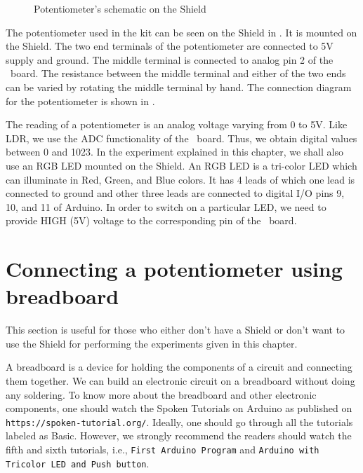 \begin{figure}
\centering
{} \hfill
{}
\caption{Potentiometer's schematic on the Shield}
\label{fig:potmeterconn}
\end{figure}

The potentiometer used in the kit can be seen on the Shield in
.  It is
mounted on the Shield. The two end terminals of the potentiometer are
connected to 5V supply and ground. The middle terminal is connected to
analog pin 2 of the \arduino\ board. The resistance between the middle
terminal and either of the two ends can be varied by rotating the
middle terminal by hand. The connection diagram for the potentiometer
is shown in .

The reading of a potentiometer is an analog voltage varying from 0 to
5V. Like LDR, we use the ADC functionality of the
\arduino\ board. Thus, we obtain digital values between 0 and 1023. 
In the experiment explained in this chapter, we shall also use an RGB
LED mounted on the Shield. An RGB LED is a tri-color LED which can
illuminate in Red, Green, and Blue colors. It has 4 leads of which one
lead is connected to ground and other three leads are connected to
digital I/O pins 9, 10, and 11 of Arduino. In order to switch on a
particular LED, we need to provide HIGH (5V) voltage to the
corresponding pin of the \arduino\ board.

\section{Connecting a potentiometer using breadboard}
This section is useful for those who either don't have a Shield or don't want to use the Shield
for performing the experiments given in this chapter.

A breadboard is a device for holding the components of a circuit and connecting 
them together. We can build an electronic circuit on a breadboard without doing any 
soldering. To know more about the breadboard and other electronic components, 
one should watch the Spoken Tutorials on Arduino as published on
{\tt https://spoken-tutorial.org/}. Ideally, one should go through all the
tutorials labeled as Basic. However, we strongly recommend the readers should
watch the fifth and sixth tutorials, i.e., {\tt First Arduino Program} and 
{\tt Arduino with Tricolor LED and Push button}.

